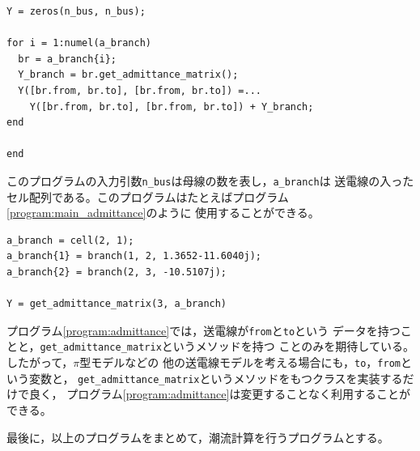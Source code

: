 \documentclass[tombow,dvipdfmx]{corona-a5-1.1}
\begin{document}
\begin{例}[オブジェクト指向によるアドミタンス行列の計算]
\begin{PROGRAMA}[count,title={get\_admittance\_matrix.m}]
\begin{verbatim}
Y = zeros(n_bus, n_bus);

for i = 1:numel(a_branch)
  br = a_branch{i};
  Y_branch = br.get_admittance_matrix();
  Y([br.from, br.to], [br.from, br.to]) =...
    Y([br.from, br.to], [br.from, br.to]) + Y_branch;
end

end
\end{verbatim}
\end{PROGRAMA}

このプログラムの入力引数\verb|n_bus|は母線の数を表し，\verb|a_branch|は
送電線の入ったセル配列である。このプログラムはたとえばプログラム\nobreak\ref{program:main_admittance}のように
使用することができる。

\begin{PROGRAMA}[count,title={main\_admittance\_matrix.m}]\label{program:main_admittance}
\begin{verbatim}
a_branch = cell(2, 1);
a_branch{1} = branch(1, 2, 1.3652-11.6040j);
a_branch{2} = branch(2, 3, -10.5107j);

Y = get_admittance_matrix(3, a_branch)
\end{verbatim}
\end{PROGRAMA}


プログラム\nobreak\ref{program:admittance}では，送電線が\verb|from|と\verb|to|という
データを持つことと，\verb|get_admittance_matrix|というメソッドを持つ
ことのみを期待している。
したがって，$\pi$型モデルなどの
他の送電線モデルを考える場合にも，\verb|to|，\verb|from|という変数と，
\verb|get_admittance_matrix|というメソッドをもつクラスを実装するだけで良く，
プログラム\nobreak\ref{program:admittance}は変更することなく利用することができる。
\end{例}

最後に，以上のプログラムをまとめて，潮流計算を行うプログラムとする。
\end{document}
